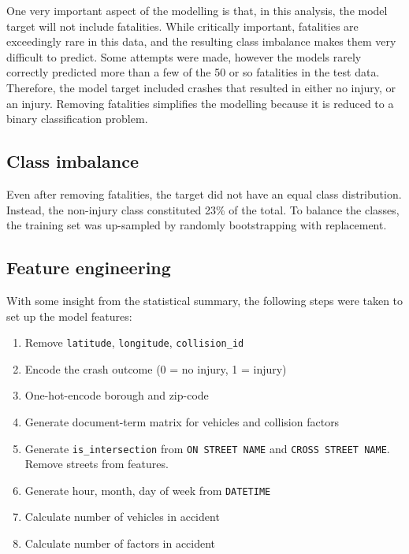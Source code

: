 \documentclass[twocolumn,oneside]{article}
\begin{document}
One very important aspect of the modelling is that, in this analysis,
the model target will not include fatalities.  While critically
important, fatalities are exceedingly rare in this data, and the
resulting class imbalance makes them very difficult to predict.  Some
attempts were made, however the models rarely correctly predicted more
than a few of the 50 or so fatalities in the test data.  Therefore,
the model target included crashes that resulted in either no injury,
or an injury.  Removing fatalities simplifies the modelling because it
is reduced to a binary classification problem.

\subsection{Class imbalance}

Even after removing fatalities, the target did not have an equal class
distribution.  Instead, the non-injury class constituted 23\% of the
total.  To balance the classes, the training set was up-sampled by
randomly bootstrapping with replacement.

\subsection{Feature engineering}

With some insight from the statistical summary, the following steps were
taken to set up the model features:

\begin{enumerate}

\item Remove \verb+latitude+, \verb+longitude+, \verb+collision_id+
\item Encode the crash outcome (0 = no injury, 1 = injury)
\item One-hot-encode borough and zip-code
\item Generate document-term matrix for vehicles and collision factors
\item Generate \verb+is_intersection+ from \verb+ON STREET NAME+ and
  \verb+CROSS STREET NAME+.  Remove streets from features.
\item Generate hour, month, day of week from \verb+DATETIME+
\item Calculate number of vehicles in accident
\item Calculate number of factors in accident

\end{enumerate}
\end{document}
